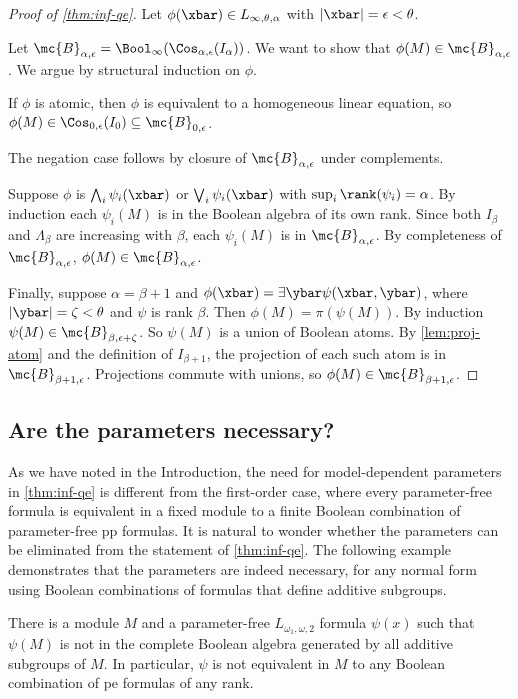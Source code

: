 \documentclass[11pt]{article}
\begin{document}
\begin{proof} [Proof of \cref{thm:inf-qe}]
Let $\phi(\xbar) \in L_{\infty,\theta,\alpha}$ with $|\xbar| = \epsilon < \theta$.

Let $\mc{B}_{\alpha,\epsilon} = \Bool_\infty(\Cos_{\alpha,\epsilon}(I_\alpha))$. We want to show that $\phi(M) \in \mc{B}_{\alpha,\epsilon}$. We argue by structural induction on $\phi$.

If $\phi$ is atomic, then $\phi$ is equivalent to a homogeneous linear equation, so $\phi(M) \in \Cos_{0,\epsilon}(I_0) \subseteq \mc{B}_{0,\epsilon}$.

The negation case follows by closure of $\mc{B}_{\alpha,\epsilon}$ under complements.

Suppose $\phi$ is $\bigwedge_i \psi_i(\xbar)$ or $\bigvee_i \psi_i(\xbar)$ with $\sup_i \rank(\psi_i) = \alpha$.
By induction each $\psi_i(M)$ is in the Boolean algebra of its own rank.
Since both $I_\beta$ and $\Lambda_\beta$ are increasing with $\beta$, each $\psi_i(M)$ is in $\mc{B}_{\alpha,\epsilon}$. 
By completeness of $\mc{B}_{\alpha,\epsilon}$, $\phi(M) \in \mc{B}_{\alpha,\epsilon}$.

Finally, suppose $\alpha = \beta+1$ and $\phi(\xbar) = \exists \ybar \psi(\xbar,\ybar)$, where $|\ybar| = \zeta < \theta$ and $\psi$ is rank $\beta$.
Then $\phi(M) = \pi(\psi(M))$.
By induction $\psi(M) \in \mc{B}_{\beta,\epsilon+\zeta}$.
So $\psi(M)$ is a union of Boolean atoms.
By \cref{lem:proj-atom} and the definition of $I_{\beta+1}$, the projection of each such atom is in $\mc{B}_{\beta+1,\epsilon}$.
Projections commute with unions, so $\phi(M) \in \mc{B}_{\beta+1,\epsilon}$.
\end{proof}

\subsection{Are the parameters necessary?}

As we have noted in the Introduction, the need for model-dependent parameters in
\cref{thm:inf-qe} is different from the first-order case, where every parameter-free formula is equivalent in a fixed module to a finite Boolean combination of parameter-free pp formulas. It is natural to wonder whether the parameters can be eliminated from the statement of \cref{thm:inf-qe}. The following example demonstrates that the parameters are indeed necessary, for any normal form using Boolean combinations of formulas that define additive subgroups.

\begin{example}
    There is a module $M$ and a parameter-free $L_{\omega_1,\omega,2}$ formula $\psi(x)$ such that $\psi(M)$ is not in the complete Boolean algebra generated by all additive subgroups of $M$. In particular, $\psi$ is not equivalent in $M$ to any Boolean combination of pe formulas of any rank.
\end{example}
\end{document}
